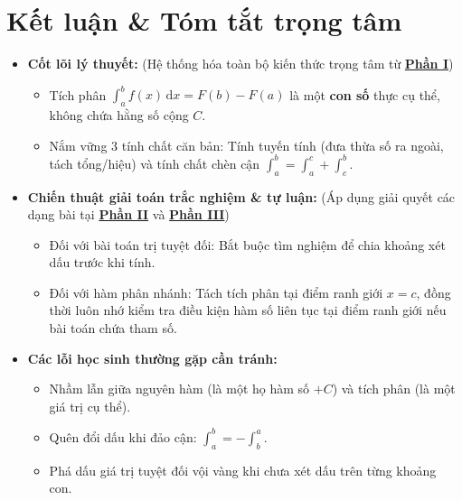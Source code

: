 \documentclass[12pt]{article}
\begin{document}
	\newpage
	
	\section{Kết luận \& Tóm tắt trọng tâm}\label{sec:ketluan}
	
	\begin{itemize}
		\item \textbf{Cốt lõi lý thuyết:} (Hệ thống hóa toàn bộ kiến thức trọng tâm từ \hyperref[sec:lythuyet]{\textbf{Phần I}})
		\begin{itemize}
			\item Tích phân $\displaystyle \int_a^b f(x)\,\mathrm{d}x = F(b) - F(a)$ là một \textbf{con số} thực cụ thể, không chứa hằng số cộng $C$.
			\item Nắm vững 3 tính chất căn bản: Tính tuyến tính (đưa thừa số ra ngoài, tách tổng/hiệu) và tính chất chèn cận $\int_a^b = \int_a^c + \int_c^b$.
		\end{itemize}
		
		\item \textbf{Chiến thuật giải toán trắc nghiệm \& tự luận:} (Áp dụng giải quyết các dạng bài tại \hyperref[sec:baitap]{\textbf{Phần II}} và \hyperref[sec:tracnghiem]{\textbf{Phần III}})
		\begin{itemize}
			\item Đối với bài toán trị tuyệt đối: Bắt buộc tìm nghiệm để chia khoảng xét dấu trước khi tính.
			\item Đối với hàm phân nhánh: Tách tích phân tại điểm ranh giới $x = c$, đồng thời luôn nhớ kiểm tra điều kiện hàm số liên tục tại điểm ranh giới nếu bài toán chứa tham số.
		\end{itemize}
		
		\item \textbf{Các lỗi học sinh thường gặp cần tránh:}
		\begin{itemize}
			\item Nhầm lẫn giữa nguyên hàm (là một họ hàm số $+ C$) và tích phân (là một giá trị cụ thể).
			\item Quên đổi dấu khi đảo cận: $\int_a^b = -\int_b^a$.
			\item Phá dấu giá trị tuyệt đối vội vàng khi chưa xét dấu trên từng khoảng con.
		\end{itemize}
	\end{itemize}
	
\end{document}
